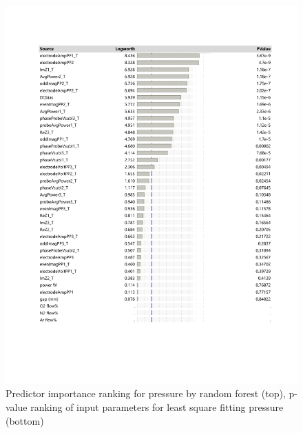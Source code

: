 \documentclass[12pt]{iopart}
\begin{document}
\begin{figure}[ht!]
\begin{center}
\begin{minipage}{0.5\textwidth}
    \includegraphics[width=1\textwidth]{jmpPressure.pdf}
\end{minipage}

\caption{Predictor importance ranking for pressure by random forest (top), p-value ranking of input parameters for least square fitting pressure (bottom) } 

\label{Fig:gap_SV,pressure_TB,species_TB}
\end{center}
\end{figure}
\end{document}

